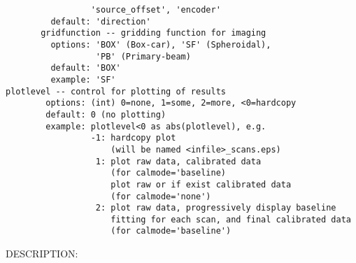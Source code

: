 \begin{verbatim}
                 'source_offset', 'encoder' 
         default: 'direction'
       gridfunction -- gridding function for imaging
         options: 'BOX' (Box-car), 'SF' (Spheroidal), 
                  'PB' (Primary-beam)
         default: 'BOX'
         example: 'SF'
plotlevel -- control for plotting of results
        options: (int) 0=none, 1=some, 2=more, <0=hardcopy
        default: 0 (no plotting)
        example: plotlevel<0 as abs(plotlevel), e.g.
                 -1: hardcopy plot 
                     (will be named <infile>_scans.eps)
                  1: plot raw data, calibrated data 
                     (for calmode='baseline)
                     plot raw or if exist calibrated data 
                     (for calmode='none')
                  2: plot raw data, progressively display baseline 
                     fitting for each scan, and final calibrated data 
                     (for calmode='baseline')  

\end{verbatim}
DESCRIPTION:

